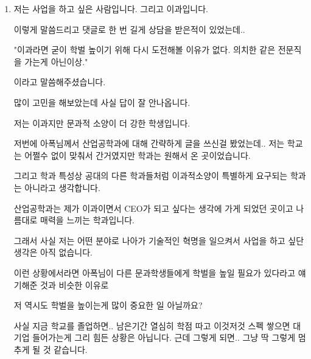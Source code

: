 \begin{enumerate}
    \item 
    \vspace{5mm}
    
    저는 사업을 하고 싶은 사람입니다. 그리고 이과입니다.
    \vspace{5mm}
    
    이렇게 말씀드리고 댓글로 한 번 길게 상담을 받은적이 있었는데..
    \vspace{5mm}
    
    "이과라면 굳이 학벌 높이기 위해 다시 도전해볼 이유가 없다. 의치한 같은 전문직을 가는게 아닌이상."
    \vspace{5mm}
    
    이라고 말씀해주셨습니다.
    \vspace{5mm}
    
    많이 고민을 해보았는데 사실 답이 잘 안나옵니다.
    \vspace{5mm}
    
    저는 이과지만 문과적 소양이 더 강한 학생입니다.
    \vspace{5mm}
    
    저번에 아폭님께서 산업공학과에 대해 간략하게 글을 쓰신걸 봤었는데.. 저는 학교는 어쩔수 없이 맞춰서 간거였지만 학과는 원해서 온 곳이었습니다.
    \vspace{5mm}
    
    그리고 학과 특성상 공대의 다른 학과들처럼 이과적소양이 특별하게 요구되는 학과는 아니라고 생각합니다.
    \vspace{5mm}
    
    산업공학과는 제가 이과이면서 CEO가 되고 싶다는 생각에 가게 되었던 곳이고 나름대로 매력을 느끼는 학과입니다.
    \vspace{5mm}
    
    그래서 사실 저는 어떤 분야로 나아가 기술적인 혁명을 일으켜서 사업을 하고 싶단 생각은 아직 없습니다.
    \vspace{5mm}
    
    이런 상황에서라면 아폭님이 다른 문과학생들에게 학벌을 높일 필요가 있다라고 얘기해준 것과 비슷한 이유로
    \vspace{5mm}
    
    저 역시도 학벌을 높이는게 많이 중요한 일 아닐까요?
    \vspace{5mm}
    
    사실 지금 학교를 졸업하면.. 남은기간 열심히 학점 따고 이것저것 스펙 쌓으면 대기업 들어가는게 그리 힘든 상황은 아닙니다. 근데 그렇게 되면.. 그냥 딱 그렇게 멈추게 될 것 같습니다.
    \vspace{5mm}
    

\end{enumerate}
